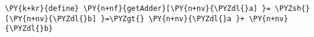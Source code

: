 \begin{Verbatim}[commandchars=\\\{\}]
\PY{k+kr}{define} \PY{n+nf}{getAdder}[\PY{n+nv}{\PYZdl{}a] }= \PYZsh{}[\PY{n+nv}{\PYZdl{}b] }=\PYZgt{} \PY{n+nv}{\PYZdl{}a }+ \PY{n+nv}{\PYZdl{}b}
\end{Verbatim}
